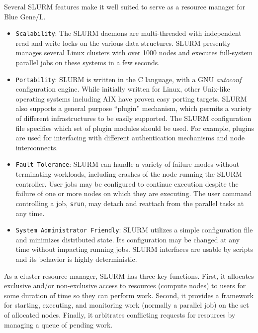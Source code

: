 \documentclass[10pt,onecolumn,times]{../common/llncs}
\begin{document}
{Several SLURM features make it well suited to serve as a resource manager 
for Blue Gene/L.

\begin{itemize}

\item {\tt Scalability}: 
The SLURM daemons are multi-threaded with independent read and write 
locks on the various data structures. 
SLURM presently manages several Linux clusters with over 1000 nodes 
and executes full-system parallel jobs on these systems in a few seconds.

\item {\tt Portability}: 
SLURM is written in the C language, with a GNU {\em autoconf} configuration engine.  
While initially written for Linux, other Unix-like operating systems including 
AIX have proven easy porting targets.
SLURM also supports a general purpose ``plugin'' mechanism, which 
permits a variety of different infrastructures to be easily supported.
The SLURM configuration file specifies which set of plugin modules 
should be used. 
For example, plugins are used for interfacing with different authentication 
mechanisms and node interconnects.

\item {\tt Fault Tolerance}: SLURM can handle a variety of failure
modes without terminating workloads, including crashes of the node
running the SLURM controller.  User jobs may be configured to continue
execution despite the failure of one or more nodes on which they are
executing.  The user command controlling a job, {\tt srun}, may detach
and reattach from the parallel tasks at any time.  

\item {\tt System Administrator Friendly}: SLURM utilizes
a simple configuration file and minimizes distributed state.
Its configuration may be changed at any time without impacting running
jobs.  SLURM interfaces are usable by scripts and its behavior is 
highly deterministic.

\end{itemize}

As a cluster resource manager, SLURM has three key functions.  First,
it allocates exclusive and/or non-exclusive access to resources (compute
nodes) to users for some duration of time so they can perform work.
Second, it provides a framework for starting, executing, and monitoring
work (normally a parallel job) on the set of allocated nodes.  Finally,
it arbitrates conflicting requests for resources by managing a queue of
pending work.

}
\end{document}
